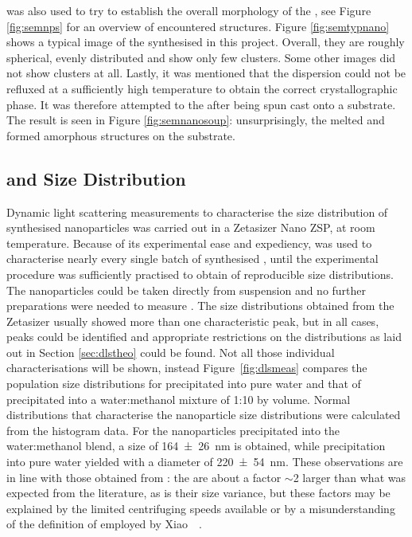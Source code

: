 \sem{} was also used to try to establish the overall morphology of the \nps{}, see Figure \ref{fig:semnps} for an overview of encountered structures. Figure \ref{fig:semtypnano} shows a typical \sem{} image of the \nps{} synthesised in this project. Overall, they are roughly spherical, evenly distributed and show only few clusters. Some other \sem{} images did not show clusters at all. Lastly, it was mentioned that the \np{} dispersion could not be refluxed at a sufficiently high temperature to obtain the correct crystallographic phase. It was therefore attempted to  the \nps{} after being spun cast onto a substrate. The result is seen in Figure \ref{fig:semnanosoup}: unsurprisingly, the \nps{} melted and formed amorphous structures on the substrate.

\subsection{\dls{} and \np{} Size Distribution}
Dynamic light scattering measurements to characterise the size distribution of synthesised nanoparticles was carried out in a Zetasizer Nano ZSP, at room temperature. Because of its experimental ease and expediency, \dls{} was used to characterise nearly every single batch of synthesised \nps{}, until the experimental procedure was sufficiently practised to obtain \nps{} of reproducible size distributions. The nanoparticles could be taken directly from suspension and no further preparations were needed to measure \dls{}. The size distributions obtained from the Zetasizer usually showed more than one characteristic peak, but in all cases,  peaks could be identified and appropriate restrictions on the distributions as laid out in Section \ref{sec:dlstheo} could be found. Not all those individual characterisations will be shown, instead Figure~\ref{fig:dlsmeas} compares the population size distributions for \nps{} precipitated into pure water and that of \nps{} precipitated into a water:methanol mixture of 1:10 by volume. Normal distributions that characterise the nanoparticle size distributions were calculated from the histogram data. For the nanoparticles precipitated into the water:methanol blend, a size of \SI{164+-26}{\nano\metre} is obtained, while precipitation into pure water yielded \nps{} with a diameter of \SI{220+-54}{\nano\metre}. These observations are in line with those obtained from \sem{}: the \nps{} are about a factor $\sim$2 larger than what was expected from the literature, as is their size variance, but these factors may be explained by the limited centrifuging speeds available or by a misunderstanding of the definition of  employed by Xiao~\etal{}~\cite{NPsynthesis}.
